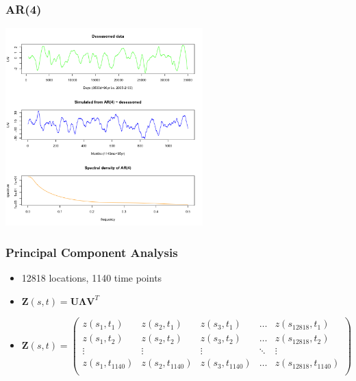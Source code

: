 \documentclass{beamer}
\begin{document}
\begin{frame}
    \frametitle{AR(4)}
    \includegraphics[height=3in]{../img/ar_sim.png}
\end{frame}

\begin{frame}
\frametitle{Principal Component Analysis}
\begin{itemize}
	\item 12818 locations, 1140 time points
	\item $\mathbf{Z}(s,t) = \mathbf{U}\mathbf{\Lambda}\mathbf{V}^T$  
	\item $\mathbf{Z}(s,t)  = \begin{pmatrix}
	z(s_1, t_1) & z(s_2, t_1) & z(s_3, t_1) & \dots & z(s_{12818}, t_1) \\
	z(s_1, t_2) & z(s_2, t_2) & z(s_3, t_2) & \dots & z(s_{12818}, t_2) \\
	\vdots & \vdots & \vdots & \ddots & \vdots\\
	z(s_1, t_{1140}) & z(s_2, t_{1140}) & z(s_3, t_{1140}) & \dots & z(s_{12818}, t_{1140})\\ 
	\end{pmatrix}$
\end{itemize}
\end{frame}
\end{document}
